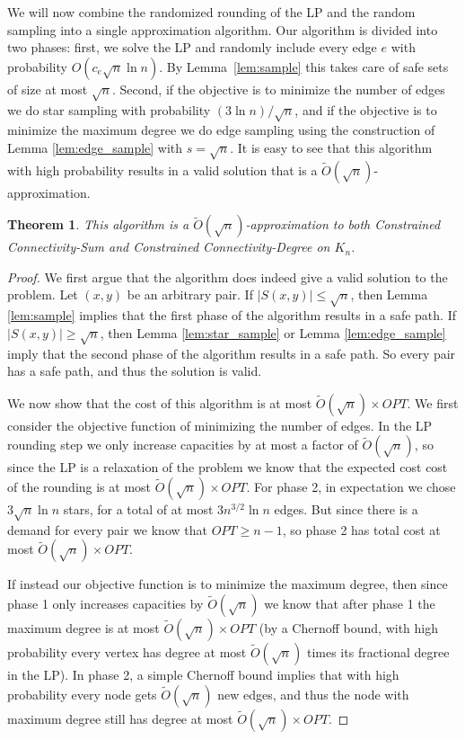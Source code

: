 \documentclass[11pt,letterpaper]{article}
\newtheorem{theorem}{Theorem}[section]
\theoremstyle{definition}
\begin{document}
We will now combine the randomized rounding of the LP and the random sampling into a single approximation algorithm.  Our algorithm is
divided into two phases: first, we solve the LP and randomly include every edge $e$ with probability $O(c_e \sqrt{n} \ln n)$.  By Lemma~\ref{lem:sample} this takes care of safe sets of size at most $\sqrt{n}$.  Second, if the objective is to
minimize the number of edges we do star sampling with probability
$(3\ln n) / \sqrt{n}$, and if the objective is to minimize the maximum
degree we do edge sampling using the construction of Lemma
\ref{lem:edge_sample} with $s = \sqrt{n}$.  It is easy to see that this algorithm with high probability results in a valid solution that is a $\tilde{O}(\sqrt{n})$-approximation.

\begin{theorem} \label{thm:approx}
  This algorithm is a $\tilde{O}(\sqrt{n})$-approximation to both {\sc Constrained Connectivity-Sum} and {\sc Constrained Connectivity-Degree} on $K_n$.
\end{theorem}
\begin{proof}
  We first argue that the algorithm does indeed give a valid solution
  to the problem.  Let $(x,y)$ be an arbitrary pair.  If $|S(x,y)|
  \leq \sqrt{n}$, then Lemma \ref{lem:sample} implies that the first phase of
  the algorithm results in a safe path.  If $|S(x,y)| \geq \sqrt{n}$,
  then Lemma \ref{lem:star_sample} or Lemma \ref{lem:edge_sample}
  imply that the second phase of the algorithm results in a safe path.
  So every pair has a safe path, and thus the solution is valid.

  We now show that the cost of this algorithm is at most
  $\tilde{O}(\sqrt{n}) \times OPT$.  We first consider the objective
  function of minimizing the number of edges.  In the LP rounding step we only
  increase capacities by at most a factor of $\tilde{O}(\sqrt{n})$, so since the
  LP is a relaxation of the problem we know that the expected cost cost of
  the rounding is at most $\tilde{O}(\sqrt{n}) \times OPT$.  For phase 2, in
  expectation we chose $3\sqrt{n} \ln n$ stars, for a total of at most
  $3 n^{3/2} \ln n$ edges.  But since there is a demand for every pair
  we know that $OPT \geq n-1$, so phase 2 has total cost at most
  $\tilde{O}(\sqrt{n}) \times OPT$.

  If instead our objective function is to minimize the maximum degree,
  then since phase 1 only increases capacities by $\tilde{O}(\sqrt{n})$ we know
  that after phase 1 the maximum degree is at most $\tilde{O}(\sqrt{n}) \times
  OPT$ (by a Chernoff bound, with high probability every vertex has degree at most $\tilde{O}(\sqrt{n})$ times its fractional degree in the LP).  In phase 2, a simple Chernoff bound implies that with high
  probability every node gets $\tilde{O}(\sqrt{n})$ new edges, and thus
  the node with maximum degree still has degree at most
  $\tilde{O}(\sqrt{n}) \times OPT$.
\end{proof}
\end{document}
